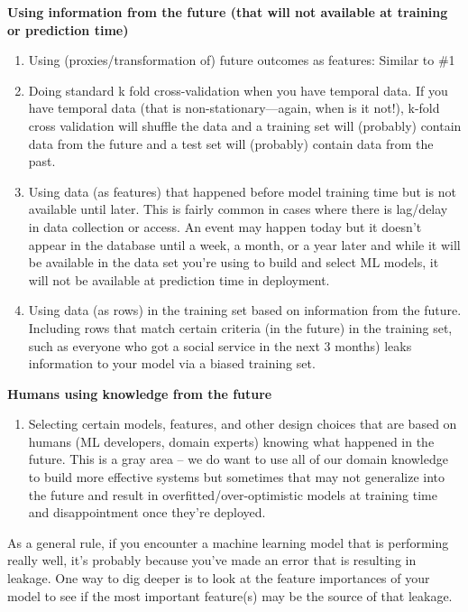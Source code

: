 \documentclass[]{krantz}
\providecommand{\tightlist}{%
  \setlength{\itemsep}{0pt}\setlength{\parskip}{0pt}}
\begin{document}
\textbf{Using information from the future (that will not available at
training or prediction time)}

\begin{enumerate}
\def\labelenumi{\arabic{enumi}.}
\setcounter{enumi}{4}
\item
  Using (proxies/transformation of) future outcomes as features: Similar
  to \#1
\item
  Doing standard k fold cross-validation when you have temporal data. If
  you have temporal data (that is non-stationary---again, when is it
  not!), k-fold cross validation will shuffle the data and a training
  set will (probably) contain data from the future and a test set will
  (probably) contain data from the past.
\item
  Using data (as features) that happened before model training time but
  is not available until later. This is fairly common in cases where
  there is lag/delay in data collection or access. An event may happen
  today but it doesn't appear in the database until a week, a month, or
  a year later and while it will be available in the data set you're
  using to build and select ML models, it will not be available at
  prediction time in deployment.
\item
  Using data (as rows) in the training set based on information from the
  future. Including rows that match certain criteria (in the future) in
  the training set, such as everyone who got a social service in the
  next 3 months) leaks information to your model via a biased training
  set.
\end{enumerate}

\textbf{Humans using knowledge from the future}

\begin{enumerate}
\def\labelenumi{\arabic{enumi}.}
\setcounter{enumi}{8}
\tightlist
\item
  Selecting certain models, features, and other design choices that are
  based on humans (ML developers, domain experts) knowing what happened
  in the future. This is a gray area -- we do want to use all of our
  domain knowledge to build more effective systems but sometimes that
  may not generalize into the future and result in
  overfitted/over-optimistic models at training time and disappointment
  once they're deployed.
\end{enumerate}

As a general rule, if you encounter a machine learning model that is
performing really well, it's probably because you've made an error that
is resulting in leakage. One way to dig deeper is to look at the feature
importances of your model to see if the most important feature(s) may be
the source of that leakage.
\end{document}
